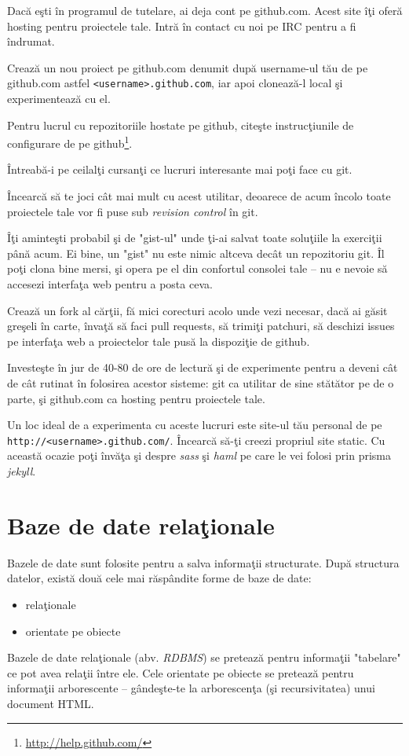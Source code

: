 \begin{Exercise}[title={A taste of git}]
Dacă eşti în programul de tutelare, ai deja cont pe github.com.
Acest site îţi oferă hosting pentru proiectele tale. Intră
în contact cu noi pe IRC pentru a fi îndrumat.

Crează un nou proiect pe github.com denumit după username-ul tău
de pe github.com astfel \texttt{<username>.github.com}, iar apoi
clonează-l local şi experimentează cu el.

Pentru lucrul cu repozitoriile hostate pe github, citeşte instrucţiunile
de configurare de pe github\footnote{\url{http://help.github.com/}}.

Întreabă-i pe ceilalţi cursanţi ce lucruri interesante mai poţi face
cu git.

Încearcă să te joci cât mai mult cu acest utilitar, deoarece de acum
încolo toate proiectele tale vor fi puse sub \textsl{revision control} în git.

Îţi aminteşti probabil şi de "gist-ul" unde ţi-ai salvat toate soluţiile
la exerciţii până acum. Ei bine, un "gist" nu este nimic altceva decât
un repozitoriu git. Îl poţi clona bine mersi, şi opera pe el
din confortul consolei tale -- nu e nevoie să accesezi interfaţa
web pentru a posta ceva.

Crează un fork al cărţii, fă mici corecturi acolo unde vezi necesar,
dacă ai găsit greşeli în carte, învaţă să faci pull
requests, să trimiţi patchuri, să deschizi issues pe interfaţa web
a proiectelor tale pusă la dispoziţie de github.

Investeşte în jur de 40-80 de ore de lectură şi de experimente pentru
a deveni cât de cât rutinat în folosirea acestor sisteme: git
ca utilitar de sine stătător pe de o parte, şi github.com ca
hosting pentru proiectele tale.

Un loc ideal de a experimenta cu aceste lucruri este site-ul tău
personal de pe \texttt{http://<username>.github.com/}. Încearcă
să-ţi creezi propriul site static. Cu această ocazie poţi învăţa
şi despre \textsl{sass} şi \textsl{haml} pe care le vei folosi
prin prisma \textsl{jekyll}.
\end{Exercise}

\section{Baze de date relaţionale}
Bazele de date sunt folosite pentru a salva informaţii structurate.
După structura datelor, există două cele mai răspândite forme de
baze de date:
\begin{itemize}
\item relaţionale
\item orientate pe obiecte
\end{itemize}
Bazele de date relaţionale (abv. \textsl{RDBMS}) se pretează pentru informaţii "tabelare"
ce pot avea relaţii între ele. Cele orientate pe obiecte se pretează
pentru informaţii arborescente -- gândeşte-te la arborescenţa
(şi recursivitatea) unui document HTML.

